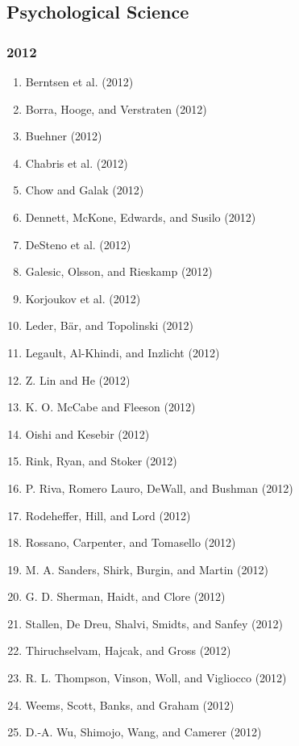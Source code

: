 \documentclass[english,man]{apa6}
\providecommand{\tightlist}{%
  \setlength{\itemsep}{0pt}\setlength{\parskip}{0pt}}
\theoremstyle{definition}
\theoremstyle{definition}
\theoremstyle{definition}
\theoremstyle{remark}
\begin{document}
\subsection{Psychological Science}\label{psychological-science}

\subsubsection{2012}\label{section-42}

\begin{enumerate}
\def\labelenumi{\arabic{enumi})}
\tightlist
\item
  Berntsen et al. (2012)
\item
  Borra, Hooge, and Verstraten (2012)
\item
  Buehner (2012)
\item
  Chabris et al. (2012)
\item
  Chow and Galak (2012)
\item
  Dennett, McKone, Edwards, and Susilo (2012)
\item
  DeSteno et al. (2012)
\item
  Galesic, Olsson, and Rieskamp (2012)
\item
  Korjoukov et al. (2012)
\item
  Leder, Bär, and Topolinski (2012)
\item
  Legault, Al-Khindi, and Inzlicht (2012)
\item
  Z. Lin and He (2012)
\item
  K. O. McCabe and Fleeson (2012)
\item
  Oishi and Kesebir (2012)
\item
  Rink, Ryan, and Stoker (2012)
\item
  P. Riva, Romero Lauro, DeWall, and Bushman (2012)
\item
  Rodeheffer, Hill, and Lord (2012)
\item
  Rossano, Carpenter, and Tomasello (2012)
\item
  M. A. Sanders, Shirk, Burgin, and Martin (2012)
\item
  G. D. Sherman, Haidt, and Clore (2012)
\item
  Stallen, De Dreu, Shalvi, Smidts, and Sanfey (2012)
\item
  Thiruchselvam, Hajcak, and Gross (2012)
\item
  R. L. Thompson, Vinson, Woll, and Vigliocco (2012)
\item
  Weems, Scott, Banks, and Graham (2012)
\item
  D.-A. Wu, Shimojo, Wang, and Camerer (2012)
\end{enumerate}
\end{document}
